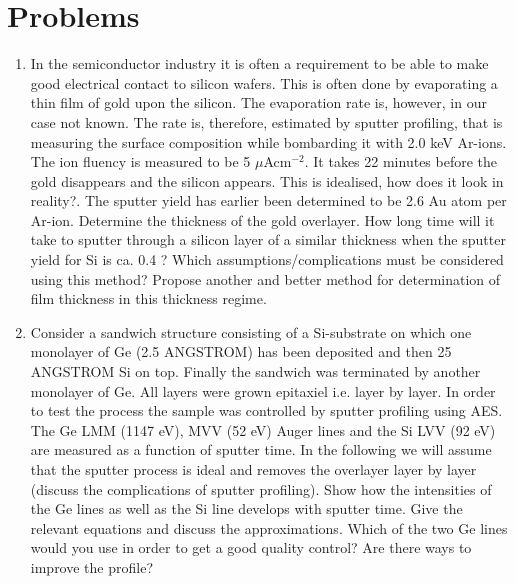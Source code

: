 \section{Problems}
 \begin{enumerate}





 \item In the semiconductor industry it is often a
 requirement to be able to make good electrical contact to
 silicon wafers. This is often done by evaporating a thin
 film of gold upon the silicon. The evaporation rate
 is, however, in our case not known. The rate is, therefore,
 estimated by sputter profiling, that is measuring the
 surface composition while bombarding it with 2.0 keV
 Ar-ions. The ion fluency is measured to be 5
 $\mu$Acm$^{-2}$. It takes 22 minutes before the gold disappears
 and the silicon appears. This is idealised, how does it look
 in reality?. The sputter yield has earlier been determined
 to be 2.6 Au atom per Ar-ion. Determine the thickness of the
 gold overlayer. How long time will it take to sputter
 through a silicon layer of a similar thickness when the
 sputter yield for Si is ca. 0.4 ? Which
 assumptions/complications must be considered using this
 method? Propose another and better method for determination
 of film thickness in this thickness regime.




 \item Consider a sandwich structure consisting of a
 Si-substrate on which one monolayer of Ge (2.5 ANGSTROM) has
 been deposited and then 25 ANGSTROM Si on top. Finally the sandwich
 was terminated by another monolayer of Ge. All layers were
 grown epitaxiel i.e. layer by layer. In order to test the
 process the sample was controlled by sputter profiling using
 AES. The Ge LMM (1147 eV), MVV (52 eV) Auger lines and the
 Si LVV (92 eV) are measured as a function of sputter time.
 In the following we will assume that the sputter process is
 ideal and removes the overlayer layer by layer (discuss the
 complications of sputter profiling). Show how the
 intensities of the Ge lines as well as the Si line develops
 with sputter time. Give the relevant equations and discuss
 the approximations. Which of the two Ge lines would you use
 in order to get a good quality control? Are there ways to
 improve the profile? 









\end{enumerate}

